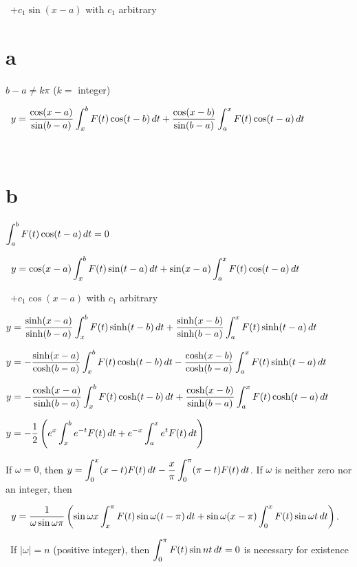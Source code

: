 \qquad\; \;  \,
$+c_{1}\sin(x-a)$ with  $c_{1}$ arbitrary

\smallskip

 \part{a}\;    $b-a\ne k\pi$ ($k=$ integer)

\qquad\; \;  \,
$y=\displaystyle{\frac{\cos(x-a)}{\sin(b-a)}\int_{x}^{b}F(t)\cos(t-b)\,dt+
\frac{\cos(x-b)}{\sin(b-a)}\int_{a}^{x}F(t)\cos(t-a)\,dt}$
\smallskip

\qquad\; \;  \,
\part{b} $\displaystyle{\int_{a}^{b}F(t)\cos(t-a)\,dt=0}$

\smallskip

\qquad\; \;  \,
$y=\displaystyle{\cos(x-a)\int_{x}^{b}F(t)\sin(t-a)\,dt+\sin(x-a)\int_{a}^{x}
F(t)\cos(t-a)\,dt}$
\smallskip

\qquad\; \;  \,
\quad  $+c_{1}\cos(x-a)$  with $c_{1}$ arbitrary

\smallskip

$y=\displaystyle{\frac{\sinh(x-a)}{\sinh(b-a)}\int_{x}^{b}F(t)\sinh(t-b)\,dt
+\frac{\sinh(x-b)}{\sinh(b-a)}\int_{a}^{x}F(t)\sinh(t-a)\,dt}$

\smallskip

$y=\displaystyle{-\frac{\sinh(x-a)}{\cosh(b-a)}\int_{x}^{b}F(t)\cosh(t-b)\,dt
-\frac{\cosh(x-b)}{\cosh(b-a)}\int_{a}^{x}F(t)\sinh(t-a)\,dt}$

\smallskip

$y=-\displaystyle{\frac{\cosh(x-a)}{\sinh(b-a)}\int_{x}^{b}F(t)\cosh(t-b)\,dt
+\frac{\cosh(x-b)}{\sinh(b-a)}\int_{a}^{x}F(t)\cosh(t-a)\,dt}$
\smallskip

$y=-\displaystyle{\frac{1}{2}\left(
e^{x}\int_{x}^{b}e^{-t}F(t)\,dt+e^{-x}\int_{a}^{x}e^{t}F(t)\,dt\right)}$

\smallskip

\rm
{} If $\omega=0$, then $y=\displaystyle{\int_{0}^{x}(x-t)F(t)\,dt-\frac{x}{\pi}\int_{0}^{\pi}(\pi-t)F(t)\,dt}$. If $\omega$ is neither zero nor an integer, then

\smallskip
\quad\;  \;  \,
$y=\displaystyle{\frac{1}{\omega\sin\omega\pi}
\left(\sin\omega x\int_{x}^{\pi}F(t)\sin\omega(t-\pi)\,dt
+\sin\omega(x-\pi)\int_{0}^{x}F(t)\sin\omega t\,dt\right)}$.

\smallskip \quad\;   \,
If $|\omega|=n$ (positive integer), then $\displaystyle{\int_{0}^{\pi}F(t)\sin
nt\,dt=0}$ is necessary for existence

